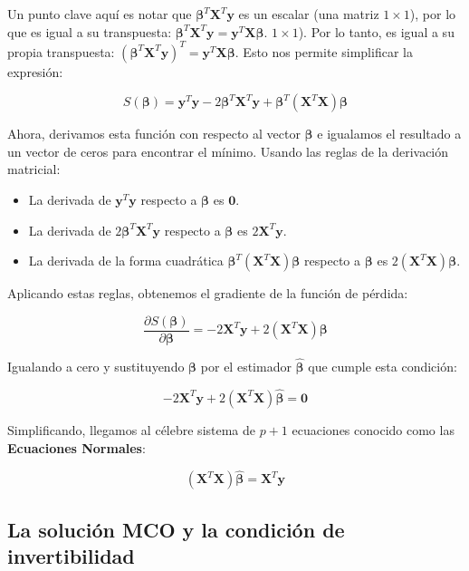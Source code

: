 \documentclass[
  letterpaper,
  DIV=11,
  numbers=noendperiod]{scrreprt}
\providecommand{\tightlist}{%
  \setlength{\itemsep}{0pt}\setlength{\parskip}{0pt}}
\begin{document}
Un punto clave aquí es notar que
\(\boldsymbol{\beta}^T\mathbf{X}^T\mathbf{y}\) es un escalar (una matriz
\(1 \times 1\)), por lo que es igual a su transpuesta:
\(\boldsymbol{\beta}^T\mathbf{X}^T\mathbf{y} = \mathbf{y}^T\mathbf{X}\boldsymbol{\beta}\).
\(1 \times 1\)). Por lo tanto, es igual a su propia transpuesta:
\((\boldsymbol{\beta}^T\mathbf{X}^T\mathbf{y})^T = \mathbf{y}^T\mathbf{X}\boldsymbol{\beta}\).
Esto nos permite simplificar la expresión:

\[S(\boldsymbol{\beta}) = \mathbf{y}^T\mathbf{y} - 2\boldsymbol{\beta}^T\mathbf{X}^T\mathbf{y} + \boldsymbol{\beta}^T(\mathbf{X}^T\mathbf{X})\boldsymbol{\beta}\]

Ahora, derivamos esta función con respecto al vector
\(\boldsymbol{\beta}\) e igualamos el resultado a un vector de ceros
para encontrar el mínimo. Usando las reglas de la derivación matricial:

\begin{itemize}
\tightlist
\item
  La derivada de \(\mathbf{y}^T\mathbf{y}\) respecto a
  \(\boldsymbol{\beta}\) es \(\mathbf{0}\).
\item
  La derivada de \(2\boldsymbol{\beta}^T\mathbf{X}^T\mathbf{y}\)
  respecto a \(\boldsymbol{\beta}\) es \(2\mathbf{X}^T\mathbf{y}\).
\item
  La derivada de la forma cuadrática
  \(\boldsymbol{\beta}^T(\mathbf{X}^T\mathbf{X})\boldsymbol{\beta}\)
  respecto a \(\boldsymbol{\beta}\) es
  \(2(\mathbf{X}^T\mathbf{X})\boldsymbol{\beta}\).
\end{itemize}

Aplicando estas reglas, obtenemos el gradiente de la función de pérdida:

\[\frac{\partial S(\boldsymbol{\beta})}{\partial \boldsymbol{\beta}} = -2\mathbf{X}^T\mathbf{y} + 2(\mathbf{X}^T\mathbf{X})\boldsymbol{\beta}\]

Igualando a cero y sustituyendo \(\boldsymbol{\beta}\) por el estimador
\(\hat{\boldsymbol{\beta}}\) que cumple esta condición:

\[-2\mathbf{X}^T\mathbf{y} + 2(\mathbf{X}^T\mathbf{X})\hat{\boldsymbol{\beta}} = \mathbf{0}\]

Simplificando, llegamos al célebre sistema de \(p+1\) ecuaciones
conocido como las \textbf{Ecuaciones Normales}:

\[(\mathbf{X}^T\mathbf{X})\hat{\boldsymbol{\beta}} = \mathbf{X}^T\mathbf{y}\]

\subsection{La solución MCO y la condición de
invertibilidad}\label{la-soluciuxf3n-mco-y-la-condiciuxf3n-de-invertibilidad}
\end{document}
